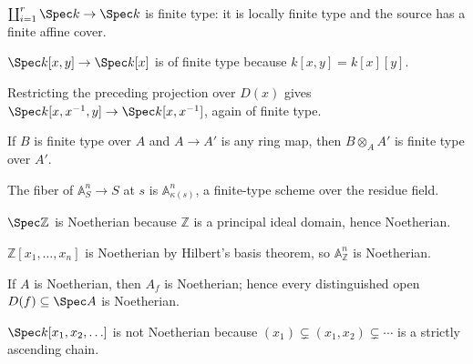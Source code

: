 \begin{example}\label{ex:vi26-r09}
$\coprod_{i=1}^r\Spec k\to\Spec k$ is finite type: it is locally finite type and the source has a finite affine cover.
\end{example}

\begin{example}\label{ex:vi26-r10}
$\Spec k[x,y]\to\Spec k[x]$ is of finite type because $k[x,y]=k[x][y]$.
\end{example}

\begin{example}\label{ex:vi26-r11}
Restricting the preceding projection over $D(x)$ gives $\Spec k[x,x^{-1},y]\to\Spec k[x,x^{-1}]$, again of finite type.
\end{example}

\begin{example}\label{ex:vi26-r12}
If $B$ is finite type over $A$ and $A\to A'$ is any ring map, then $B\otimes_AA'$ is finite type over $A'$.
\end{example}

\begin{example}\label{ex:vi26-r13}
The fiber of $\mathbb A^n_S\to S$ at $s$ is $\mathbb A^n_{\kappa(s)}$, a finite-type scheme over the residue field.
\end{example}

\begin{example}\label{ex:vi26-r14}
$\Spec\mathbb Z$ is Noetherian because $\mathbb Z$ is a principal ideal domain, hence Noetherian.
\end{example}

\begin{example}\label{ex:vi26-r15}
$\mathbb Z[x_1,\dots,x_n]$ is Noetherian by Hilbert's basis theorem, so $\mathbb A^n_{\mathbb Z}$ is Noetherian.
\end{example}

\begin{example}\label{ex:vi26-r16}
If $A$ is Noetherian, then $A_f$ is Noetherian; hence every distinguished open $D(f)\subseteq\Spec A$ is Noetherian.
\end{example}

\begin{example}\label{ex:vi26-r17}
$\Spec k[x_1,x_2,\ldots]$ is not Noetherian because $(x_1)\subsetneq(x_1,x_2)\subsetneq\cdots$ is a strictly ascending chain.
\end{example}

